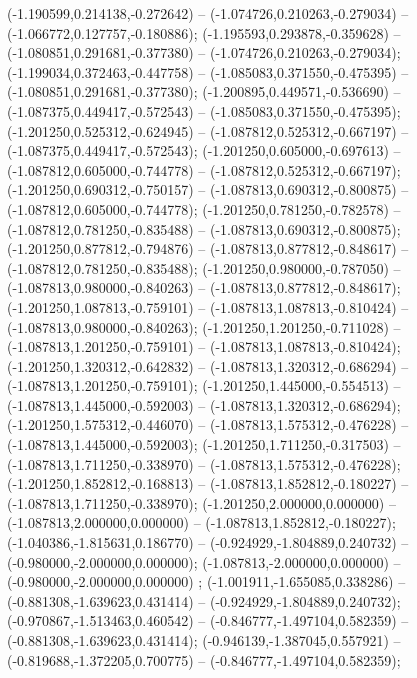  (-1.190599,0.214138,-0.272642) -- (-1.074726,0.210263,-0.279034) -- (-1.066772,0.127757,-0.180886);
 (-1.195593,0.293878,-0.359628) -- (-1.080851,0.291681,-0.377380) -- (-1.074726,0.210263,-0.279034);
 (-1.199034,0.372463,-0.447758) -- (-1.085083,0.371550,-0.475395) -- (-1.080851,0.291681,-0.377380);
 (-1.200895,0.449571,-0.536690) -- (-1.087375,0.449417,-0.572543) -- (-1.085083,0.371550,-0.475395);
 (-1.201250,0.525312,-0.624945) -- (-1.087812,0.525312,-0.667197) -- (-1.087375,0.449417,-0.572543);
 (-1.201250,0.605000,-0.697613) -- (-1.087812,0.605000,-0.744778) -- (-1.087812,0.525312,-0.667197);
 (-1.201250,0.690312,-0.750157) -- (-1.087813,0.690312,-0.800875) -- (-1.087812,0.605000,-0.744778);
 (-1.201250,0.781250,-0.782578) -- (-1.087812,0.781250,-0.835488) -- (-1.087813,0.690312,-0.800875);
 (-1.201250,0.877812,-0.794876) -- (-1.087813,0.877812,-0.848617) -- (-1.087812,0.781250,-0.835488);
 (-1.201250,0.980000,-0.787050) -- (-1.087813,0.980000,-0.840263) -- (-1.087813,0.877812,-0.848617);
 (-1.201250,1.087813,-0.759101) -- (-1.087813,1.087813,-0.810424) -- (-1.087813,0.980000,-0.840263);
 (-1.201250,1.201250,-0.711028) -- (-1.087813,1.201250,-0.759101) -- (-1.087813,1.087813,-0.810424);
 (-1.201250,1.320312,-0.642832) -- (-1.087813,1.320312,-0.686294) -- (-1.087813,1.201250,-0.759101);
 (-1.201250,1.445000,-0.554513) -- (-1.087813,1.445000,-0.592003) -- (-1.087813,1.320312,-0.686294);
 (-1.201250,1.575312,-0.446070) -- (-1.087813,1.575312,-0.476228) -- (-1.087813,1.445000,-0.592003);
 (-1.201250,1.711250,-0.317503) -- (-1.087813,1.711250,-0.338970) -- (-1.087813,1.575312,-0.476228);
 (-1.201250,1.852812,-0.168813) -- (-1.087813,1.852812,-0.180227) -- (-1.087813,1.711250,-0.338970);
 (-1.201250,2.000000,0.000000) -- (-1.087813,2.000000,0.000000) -- (-1.087813,1.852812,-0.180227);
 (-1.040386,-1.815631,0.186770) -- (-0.924929,-1.804889,0.240732) -- (-0.980000,-2.000000,0.000000);
 (-1.087813,-2.000000,0.000000) -- (-0.980000,-2.000000,0.000000) ;
 (-1.001911,-1.655085,0.338286) -- (-0.881308,-1.639623,0.431414) -- (-0.924929,-1.804889,0.240732);
 (-0.970867,-1.513463,0.460542) -- (-0.846777,-1.497104,0.582359) -- (-0.881308,-1.639623,0.431414);
 (-0.946139,-1.387045,0.557921) -- (-0.819688,-1.372205,0.700775) -- (-0.846777,-1.497104,0.582359);
